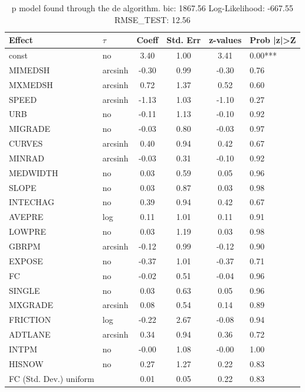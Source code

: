 \begin{table}
	\caption{p model found through the de algorithm. bic: 1867.56 Log-Likelihood: -667.55 RMSE_TEST: 12.56}
	\begin{center}
		\begin{tabular}{|l|l|c|c|c|l|}
			\hline
			Effect & $\tau$ & Coeff & Std. Err & z-values & Prob |z|>Z \\
			\hline
			const & no & 3.40 & 1.00 & 3.41 & 0.00*** \\
			\hline
			MIMEDSH & arcsinh & -0.30 & 0.99 & -0.30 & 0.76 \\
			\hline
			MXMEDSH & arcsinh & 0.72 & 1.37 & 0.52 & 0.60 \\
			\hline
			SPEED & arcsinh & -1.13 & 1.03 & -1.10 & 0.27 \\
			\hline
			URB & no & -0.11 & 1.13 & -0.10 & 0.92 \\
			\hline
			MIGRADE & no & -0.03 & 0.80 & -0.03 & 0.97 \\
			\hline
			CURVES & arcsinh & 0.40 & 0.94 & 0.42 & 0.67 \\
			\hline
			MINRAD & arcsinh & -0.03 & 0.31 & -0.10 & 0.92 \\
			\hline
			MEDWIDTH & no & 0.03 & 0.59 & 0.05 & 0.96 \\
			\hline
			SLOPE & no & 0.03 & 0.87 & 0.03 & 0.98 \\
			\hline
			INTECHAG & no & 0.39 & 0.94 & 0.42 & 0.67 \\
			\hline
			AVEPRE & log & 0.11 & 1.01 & 0.11 & 0.91 \\
			\hline
			LOWPRE & no & 0.03 & 1.19 & 0.03 & 0.98 \\
			\hline
			GBRPM & arcsinh & -0.12 & 0.99 & -0.12 & 0.90 \\
			\hline
			EXPOSE & no & -0.37 & 1.01 & -0.37 & 0.71 \\
			\hline
			FC & no & -0.02 & 0.51 & -0.04 & 0.96 \\
			\hline
			SINGLE & no & 0.03 & 0.63 & 0.05 & 0.96 \\
			\hline
			MXGRADE & arcsinh & 0.08 & 0.54 & 0.14 & 0.89 \\
			\hline
			FRICTION & log & -0.22 & 2.67 & -0.08 & 0.94 \\
			\hline
			ADTLANE & arcsinh & 0.34 & 0.94 & 0.36 & 0.72 \\
			\hline
			INTPM & no & -0.00 & 1.08 & -0.00 & 1.00 \\
			\hline
			HISNOW & no & 0.27 & 1.27 & 0.22 & 0.83 \\
			\hline
			FC (Std. Dev.) uniform &  & 0.01 & 0.05 & 0.22 & 0.83 \\

\end{tabular}
\end{center}
\end{table}
